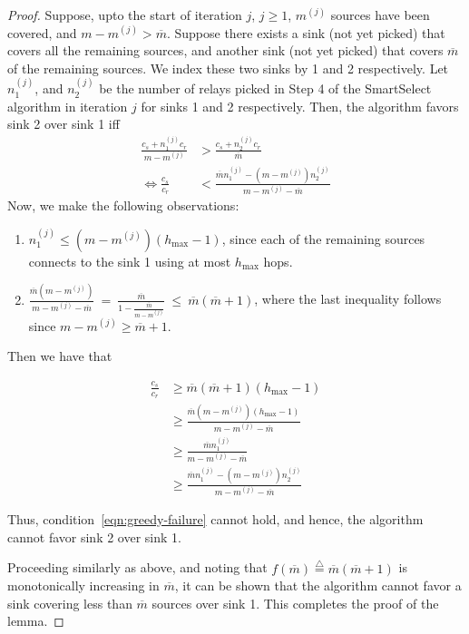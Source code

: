 \documentclass[conference]{IEEEtran}
\newcommand{\define}{\stackrel{\triangle}{=}}
\newcommand{\mbar}{\overline{m}}
\begin{document}
\begin{proof}
Suppose, upto the start of iteration $j$, $j\geq 1$, $m^{(j)}$ sources have been covered, and $m-m^{(j)}> \mbar$. Suppose there exists a sink (not yet picked) that covers all the remaining sources, and another sink (not yet picked) that covers $\mbar$ of the remaining sources. We index these two sinks by 1 and 2 respectively. Let $n_1^{(j)}$, and $n_2^{(j)}$ be the number of relays picked in Step 4 of the SmartSelect algorithm in iteration $j$ for sinks 1 and 2 respectively. Then, the algorithm favors sink 2 over sink 1 iff
\begin{align}
\frac{c_s+n_1^{(j)}c_r}{m-m^{(j)}} &> \frac{c_s+n_2^{(j)}c_r}{\mbar}\nonumber\\
\Leftrightarrow \frac{c_s}{c_r}&< \frac{\mbar n_1^{(j)}-(m-m^{(j)})n_2^{(j)}}{m-m^{(j)}-\mbar}\label{eqn:greedy-failure}
\end{align}
Now, we make the following observations:
\begin{enumerate}
\item $n_1^{(j)}\leq (m-m^{(j)})(h_{\max}-1)$, since each of the remaining sources connects to the sink 1 using at most $h_{\max}$ hops.
\item $\frac{\mbar (m-m^{(j)})}{m-m^{(j)}-\mbar}\:=\:\frac{\mbar}{1-\frac{\mbar}{m-m^{(j)}}}\:\leq\:\mbar(\mbar + 1)$, where the last inequality follows since $m-m^{(j)}\geq \mbar+1$. 
\end{enumerate} 

Then we have that

\begin{align}
\frac{c_s}{c_r}&\geq \mbar(\mbar+1)(h_{\max}-1)\nonumber\\
&\geq \frac{\mbar(m-m^{(j)})(h_{\max}-1)}{m-m^{(j)}-\mbar}\nonumber\\
&\geq \frac{\mbar n_1^{(j)}}{m-m^{(j)}-\mbar}\nonumber\\
&\geq \frac{\mbar n_1^{(j)}-(m-m^{(j)})n_2^{(j)}}{m-m^{(j)}-\mbar}\nonumber
\end{align}

Thus, condition~\eqref{eqn:greedy-failure} cannot hold, and hence, the algorithm cannot favor sink 2 over sink 1.

Proceeding similarly as above, and noting that $f(\mbar)\define\mbar(\mbar+1)$ is monotonically increasing in $\mbar$, it can be shown that the algorithm cannot favor a sink covering less than $\mbar$ sources over sink 1. This completes the proof of the lemma.
\end{proof}
\end{document}
